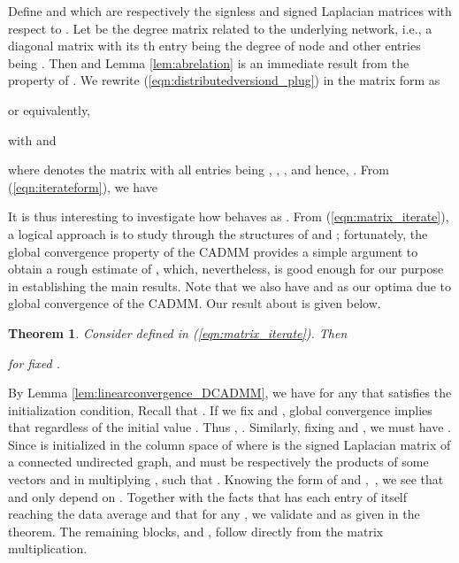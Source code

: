\documentclass[journal]{IEEEtran}
\newtheorem{theorem}{Theorem}
\begin{document}
Define  and  which are respectively the signless and signed Laplacian matrices with respect to . Let  be the degree matrix related to the underlying network, i.e., a diagonal matrix with its th entry being the degree of node  and other entries being . Then   and Lemma \ref{lem:abrelation} is an immediate result from the property of  \cite{ChungSpectral}. We rewrite (\ref{eqn:distributedversiond_plug}) in the matrix form as

or equivalently,

with 
and

where  denotes the  matrix with all entries being , , , and hence, . From (\ref{eqn:iterateform}), we have 

It is thus interesting to investigate how  behaves as . From (\ref{eqn:matrix_iterate}), a logical approach is to study  through the structures of  and ; fortunately, the global convergence property of the CADMM provides a simple argument to obtain a rough estimate of , which, nevertheless, is good enough for our purpose in establishing the main results. Note that we also have  and  as our optima due to global convergence of the CADMM. Our result about  is given below.
\begin{theorem}
\label{thm:Dproperty}
Consider  defined in (\ref{eqn:matrix_iterate}). Then

for fixed .
\end{theorem}
\begin{IEEEproof}
By Lemma \ref{lem:linearconvergence_DCADMM}, we have for any  that satisfies the initialization condition, Recall that . If we fix  and , global convergence implies that  regardless of the initial value . Thus , . Similarly, fixing  and , we must have . Since  is initialized in the column space of  where  is the signed Laplacian matrix of a connected undirected graph,  and  must be respectively the products of some vectors  and  in  multiplying , such that . Knowing the form of  and ,~, we see that  and  only depend on . Together with the facts that  has each entry of itself reaching the data average  and that  for any , we validate  and  as given in the theorem. The remaining blocks,  and , follow directly from the matrix multiplication.
\end{IEEEproof}
\end{document}
